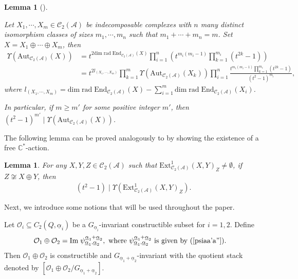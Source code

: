 \documentclass[12pt]{amsart}
\newtheorem{lemma}[theorem]{Lemma}
\theoremstyle{definition}
\numberwithin{equation}{section}
\begin{document}
\begin{lemma}[{\itshape\cite[Lemma 6.9]{FLX24}}]\;
    \label{Upsilon(Aut)}
    
    Let $ X_1, \cdots, X_m \in \mathcal{C}_2(\mathcal{A}) $ be indecomposable complexes with $ n $ many distinct isomorphism classes of sizes $m_1,\cdots,m_n$ such that $m_1+\cdots+m_n=m$. 
    Set $ X =  X_1 \oplus \cdots \oplus X_m $, then
    \begin{align*}
        \Upsilon(\mathrm{Aut}_{\mathcal{C}_2(\mathcal{A})}(X)) &= t^{2 \mathrm{dim}\; \mathrm{rad}\;\mathrm{End}_{\mathcal{C}_2(\mathcal{A})}(X)}\prod_{i=1}^n (t^{m_i(m_i-1)}\prod^{m_i}_{k=1}(t^{2k}-1)) \\
        &= t^{2l_{(X_1,\cdots,X_m)}} \prod_{k=1}^m \Upsilon(\mathrm{Aut}_{\mathcal{C}_2(\mathcal{A})}(X_k)) \prod_{i=1}^n\frac{t^{m_i(m_i-1)}\prod^{m_i}_{k=1}(t^{2k}-1)}{(t^2-1)^{m_i}},
    \end{align*}
    where $ l_{(X_1,\cdots,X_m)} = \mathrm{dim}\;\mathrm{rad}\;\mathrm{End_{\mathcal{C}_2(\mathcal{A})}}(X)-\sum_{i=1}^m\mathrm{dim}\;\mathrm{rad}\;\mathrm{End_{\mathcal{C}_2(\mathcal{A})}}(X_i) $.
    
    In particular, if $ m \geqslant m' $ for some positive integer $ m' $, then $ (t^2-1)^{m'} \mid \Upsilon(\mathrm{Aut}_{\mathcal{C}_2(\mathcal{A})}(X)) $.
    \end{lemma}

The following lemma can be proved analogously to \cite[Lemma 5.2]{DXX10} by showing the existence of a free $ \mathbb{C}^* $-action.

\begin{lemma}
    \label{Ext^1(X,Y)Z}
     For any $ X,Y,Z \in \mathcal{C}_2(\mathcal{A}) $ such that $ \mathrm{Ext}^1_{\mathcal{C}_2(\mathcal{A})}(X, Y)_{Z} \neq \emptyset $, if $ Z \not\cong  X \oplus Y  $, then
    \begin{align*}
     (t^2-1) \mid \Upsilon(\mathrm{Ext}^1_{\mathcal{C}_2(\mathcal{A})}(X,Y)_{Z}).
    \end{align*}
\end{lemma}

Next, we introduce some notions that will be used throughout the paper. 

Let $ \mathcal{O}_i \subseteq  C_2(Q,\underline{\alpha}_i) $ be a $ G_{\underline{\alpha}_i} $-invariant constructible subset for $ i=1,2 $. 
Define
\begin{align*}
    \mathcal{O}_1 \oplus \mathcal{O}_2 &= \mathrm{Im}\;\psi^{\underline{\alpha}_1+\underline{\alpha}_2}_{\underline{\alpha}_1, \underline{\alpha}_2}, \text{ where } \psi^{\underline{\alpha}_1+\underline{\alpha}_2}_{\underline{\alpha}_1, \underline{\alpha}_2} \text{ is given by (\ref{psiaa'a''})}.
\end{align*}
Then $ \mathcal{O}_1 \oplus \mathcal{O}_2 $ is constructible and $ G_{\underline{\alpha}_1+\underline{\alpha}_2} $-invariant with the quotient stack denoted by $ [\mathcal{O}_1 \oplus \mathcal{O}_2/G_{\underline{\alpha}_1+\underline{\alpha}_2} ] $.
\end{document}
